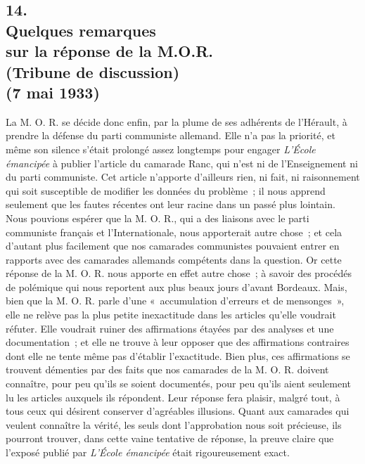 \documentclass[french,twoside]{book} %
\begin{document}
\subsection[14. Quelques remarques, sur la réponse de la M.O.R.  (Tribune de discussion) (7 mai 1933)]{14. \\
Quelques remarques \\
sur la réponse de la M.O.R. \protect\footnotemark  \\
(Tribune de discussion) \\
(7 mai 1933)}
\noindent \par
La M. O. R. se décide donc enfin, par la plume de ses adhérents de l'Hérault, à prendre la défense du parti communiste allemand. Elle n'a pas la priorité, et même son silence s'était prolongé assez longtemps pour engager {\itshape L'École émancipée} à publier l'article du camarade Ranc, qui n'est ni de l'Ensei­gnement ni du parti communiste. Cet article n'apporte d'ailleurs rien, ni fait, ni raisonnement qui soit susceptible de modifier les données du problème ; il nous apprend seulement que les fautes récentes ont leur racine dans un passé plus lointain. Nous pouvions espérer que la M. O. R., qui a des liaisons avec le parti communiste français et l'Internationale, nous apporterait autre chose ; et cela d'autant plus facilement que nos camarades communistes pouvaient entrer en rapports avec des camarades allemands compétents dans la question. Or cette réponse de la M. O. R. nous apporte en effet autre chose ; à savoir des procédés de polémique qui nous reportent aux plus beaux jours d'avant Bordeaux. Mais, bien que la M. O. R. parle d'une « accumulation d'erreurs et de mensonges », elle ne relève pas la plus petite inexactitude dans les articles qu'elle voudrait réfuter. Elle voudrait ruiner des affirmations étayées par des analyses et une documentation ; et elle ne trouve à leur opposer que des affirmations contraires dont elle ne tente même pas d'établir l'exactitude. Bien plus, ces affirmations se trouvent démenties par des faits que nos camarades de la M. O. R. doivent connaître, pour peu qu'ils se soient documentés, pour peu qu'ils aient seulement lu les articles auxquels ils répondent. Leur réponse fera plaisir, malgré tout, à tous ceux qui désirent conserver d'agréables illusions. Quant aux camarades qui veulent connaître la vérité, les seuls dont l'approbation nous soit précieuse, ils pourront trouver, dans cette vaine tentative de réponse, la preuve claire que l'exposé publié par {\itshape L'École émanci­pée} était rigoureusement exact.\par
\end{document}

